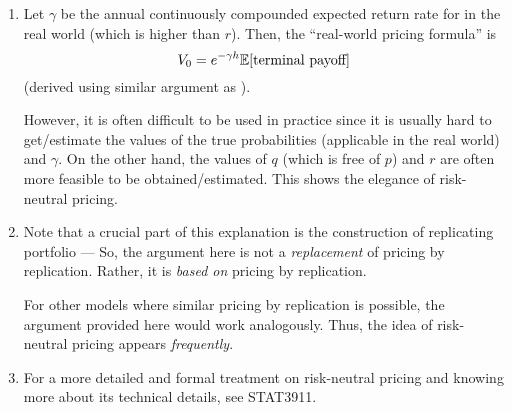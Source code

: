 \begin{enumerate}
\item Let \(\gamma\) be the annual continuously compounded expected return rate
for  in the real world (which is higher than \(r\)). Then, the
``real-world pricing formula'' is
\[
V_0=e^{-\gamma h}\mathbb{E}\qty[\text{terminal payoff}]
\]
(derived using similar argument as ).

However, it is often difficult to be used in practice since it is usually hard
to get/estimate the values of the true probabilities (applicable in the real
world) and \(\gamma\). On the other hand, the values of \(q\) (which is free of
\(p\)) and \(r\) are often more feasible to be obtained/estimated. This shows
the elegance of risk-neutral pricing.

\item Note that a crucial part of this explanation is the construction of
replicating portfolio --- So, the argument here is not a \emph{replacement} of
pricing by replication. Rather, it is \emph{based on} pricing by replication.

For other models where similar pricing by replication is possible, the argument
provided here would work analogously. Thus, the idea of risk-neutral
pricing appears \emph{frequently}.

\item For a more detailed and formal treatment on risk-neutral pricing and
knowing more about its technical details, see STAT3911.
\end{enumerate}
